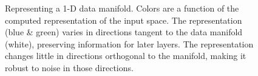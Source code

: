 \begin{figure}[h]
\centering
\caption[Desirable properties of representations of manifolds]
{Representing a 1-D data manifold.
Colors are a function of the computed representation of the input space.
The representation (blue \& green) varies in directions tangent to the data manifold (white), preserving information for later layers. 
The representation changes little in directions orthogonal to the manifold, making it robust to noise in those directions.
}
\label{fig:hidden}
\end{figure}

